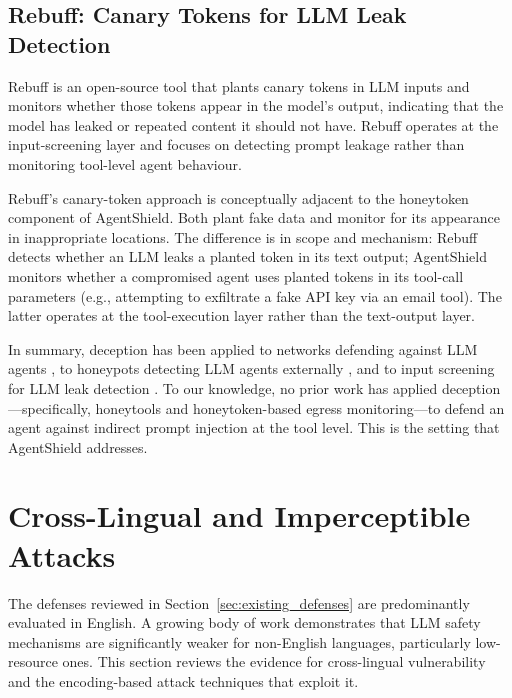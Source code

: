 \subsection{Rebuff: Canary Tokens for LLM Leak Detection}

\begin{justify}
Rebuff \citep{protectai2023rebuff} is an open-source tool that plants canary tokens in LLM inputs and monitors whether those tokens appear in the model's output, indicating that the model has leaked or repeated content it should not have.  Rebuff operates at the input-screening layer and focuses on detecting prompt leakage rather than monitoring tool-level agent behaviour.
\end{justify}

\begin{justify}
Rebuff's canary-token approach is conceptually adjacent to the honeytoken component of AgentShield.  Both plant fake data and monitor for its appearance in inappropriate locations.  The difference is in scope and mechanism: Rebuff detects whether an LLM leaks a planted token in its text output; AgentShield monitors whether a compromised agent uses planted tokens in its tool-call parameters (e.g., attempting to exfiltrate a fake API key via an email tool).  The latter operates at the tool-execution layer rather than the text-output layer.
\end{justify}

\begin{justify}
In summary, deception has been applied to networks defending against LLM agents \citep{ayzenshteyn2025cloak}, to honeypots detecting LLM agents externally \citep{reworr2024llm}, and to input screening for LLM leak detection \citep{protectai2023rebuff}.  To our knowledge, no prior work has applied deception---specifically, honeytools and honeytoken-based egress monitoring---to defend an agent against indirect prompt injection at the tool level.  This is the setting that AgentShield addresses.
\end{justify}


\section{Cross-Lingual and Imperceptible Attacks}
\label{sec:crosslingual}

\begin{justify}
The defenses reviewed in Section~\ref{sec:existing_defenses} are predominantly evaluated in English.  A growing body of work demonstrates that LLM safety mechanisms are significantly weaker for non-English languages, particularly low-resource ones.  This section reviews the evidence for cross-lingual vulnerability and the encoding-based attack techniques that exploit it.
\end{justify}

